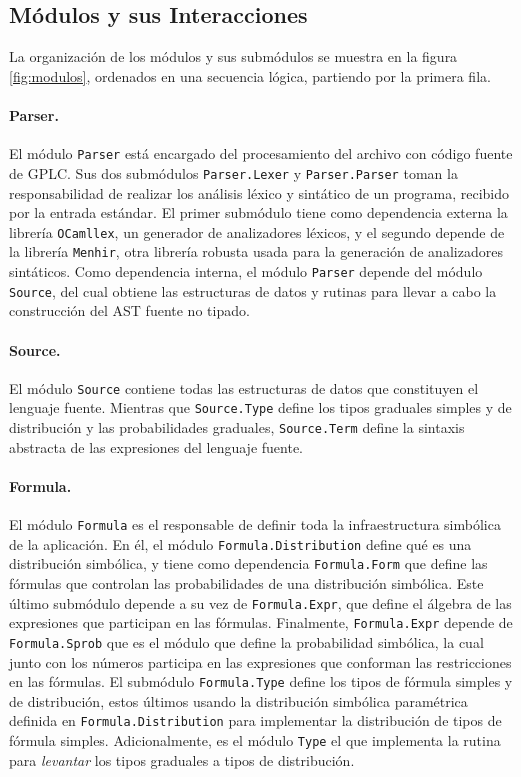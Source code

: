 \subsection{Módulos y sus Interacciones}

La organización de los módulos y sus submódulos se muestra en la
figura \ref{fig:modulos}, ordenados en una secuencia lógica, partiendo
por la primera fila.

\paragraph{Parser.} El módulo \verb|Parser| está encargado del procesamiento del archivo
con código fuente de GPLC. Sus dos submódulos \verb|Parser.Lexer| y
\verb|Parser.Parser| toman la responsabilidad de realizar los
análisis léxico y sintático de un programa, recibido por la entrada
estándar. El primer submódulo tiene como dependencia externa la
librería \verb|OCamllex|, un generador de analizadores
léxicos, y el segundo depende de la librería \verb|Menhir|, otra
librería robusta usada para la generación de analizadores sintáticos.
Como dependencia interna, el módulo \verb|Parser| depende del módulo
\verb|Source|, del cual obtiene las estructuras de datos y rutinas para
llevar a cabo la construcción del AST fuente no tipado.

\paragraph{Source.} El módulo \verb|Source| contiene todas las
estructuras de datos que constituyen el lenguaje fuente. Mientras que
\verb|Source.Type| define los tipos graduales simples y de
distribución y las probabilidades graduales, \verb|Source.Term| define la sintaxis abstracta de las expresiones del lenguaje fuente.

\paragraph{Formula.} El módulo \verb|Formula| es el responsable de
definir toda la infraestructura simbólica de la aplicación. En él,
el módulo \verb|Formula.Distribution| define qué es una distribución
simbólica, y tiene como dependencia \verb|Formula.Form| que define
las fórmulas que controlan las probabilidades de una distribución
simbólica. Este último submódulo depende a su vez de \verb|Formula.Expr|, que define el álgebra de las expresiones
que participan en las fórmulas. Finalmente, \verb|Formula.Expr| depende de \verb|Formula.Sprob| que es el módulo que define la probabilidad simbólica, la cual junto con los números participa en las expresiones que conforman las restricciones en las fórmulas. El submódulo \verb|Formula.Type| define los tipos de fórmula simples y de distribución, estos últimos usando la distribución simbólica paramétrica definida en \verb|Formula.Distribution| para implementar la distribución de tipos de fórmula simples. Adicionalmente, es el módulo \verb|Type| el que implementa la rutina para \emph{levantar} los tipos graduales a tipos de distribución.

